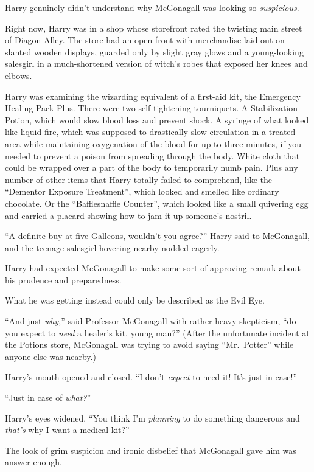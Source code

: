 Harry genuinely didn’t understand why McGonagall was looking so \emph{suspicious}.

Right now, Harry was in a shop whose storefront rated the twisting main street of Diagon Alley. The store had an open front with merchandise laid out on slanted wooden displays, guarded only by slight gray glows and a young-looking salesgirl in a much-shortened version of witch’s robes that exposed her knees and elbows.

Harry was examining the wizarding equivalent of a first-aid kit, the Emergency Healing Pack Plus. There were two self-tightening tourniquets. A Stabilization Potion, which would slow blood loss and prevent shock. A syringe of what looked like liquid fire, which was supposed to drastically slow circulation in a treated area while maintaining oxygenation of the blood for up to three minutes, if you needed to prevent a poison from spreading through the body. White cloth that could be wrapped over a part of the body to temporarily numb pain. Plus any number of other items that Harry totally failed to comprehend, like the “Dementor Exposure Treatment”, which looked and smelled like ordinary chocolate. Or the “Bafflesnaffle Counter”, which looked like a small quivering egg and carried a placard showing how to jam it up someone’s nostril.

“A definite buy at five Galleons, wouldn’t you agree?” Harry said to McGonagall, and the teenage salesgirl hovering nearby nodded eagerly.

Harry had expected McGonagall to make some sort of approving remark about his prudence and preparedness.

What he was getting instead could only be described as the Evil Eye.

“And just \emph{why},” said Professor McGonagall with rather heavy skepticism, “do you expect to \emph{need} a healer’s kit, young man?” (After the unfortunate incident at the Potions store, McGonagall was trying to avoid saying “Mr.~Potter” while anyone else was nearby.)

Harry’s mouth opened and closed. “I don’t \emph{expect} to need it! It’s just in case!”

“Just in case of \emph{what?}”

Harry’s eyes widened. “You think I’m \emph{planning} to do something dangerous and \emph{that’s} why I want a medical kit?”

The look of grim suspicion and ironic disbelief that McGonagall gave him was answer enough.


